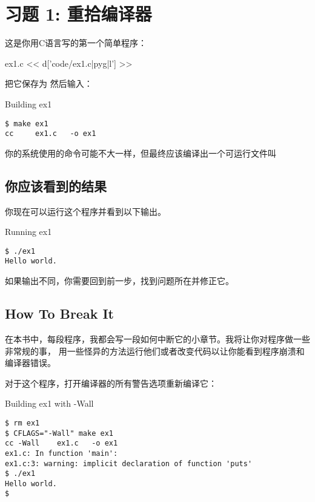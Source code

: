 \chapter{习题 1: 重拾编译器}

这是你用C语言写的第一个简单程序：

\begin{code}{ex1.c}
<< d['code/ex1.c|pyg|l'] >>
\end{code}

把它保存为  然后输入：

\begin{Terminal}{Building ex1}
\begin{lstlisting}
$ make ex1
cc     ex1.c   -o ex1
\end{lstlisting}
\end{Terminal}

你的系统使用的命令可能不大一样，但最终应该编译出一个可运行文件叫 

\section{你应该看到的结果}

你现在可以运行这个程序并看到以下输出。

\begin{Terminal}{Running ex1}
\begin{lstlisting}
$ ./ex1
Hello world.
\end{lstlisting}
\end{Terminal}

如果输出不同，你需要回到前一步，找到问题所在并修正它。

\section{How To Break It}

在本书中，每段程序，我都会写一段如何中断它的小章节。我将让你对程序做一些非常规的事，
用一些怪异的方法运行他们或者改变代码以让你能看到程序崩溃和编译器错误。

对于这个程序，打开编译器的所有警告选项重新编译它：

\begin{Terminal}{Building ex1 with -Wall}
\begin{lstlisting}
$ rm ex1
$ CFLAGS="-Wall" make ex1
cc -Wall    ex1.c   -o ex1
ex1.c: In function 'main':
ex1.c:3: warning: implicit declaration of function 'puts'
$ ./ex1
Hello world.
$ 
\end{lstlisting}
\end{Terminal}


